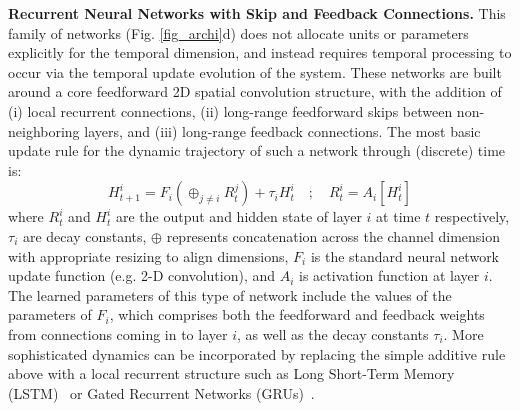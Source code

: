 \textbf{Recurrent Neural Networks with Skip and Feedback Connections.} This family of networks (Fig. \ref{fig_archi}d) does not allocate units or parameters explicitly for the temporal dimension, and instead requires temporal processing to occur via the temporal update evolution of the system.  These networks are built around a core feedforward 2D spatial convolution structure, with the addition of (i) local recurrent connections, (ii) long-range feedforward skips between non-neighboring layers, and (iii) long-range feedback connections.  
The most basic update rule for the dynamic trajectory of such a network through (discrete) time is: 
$$H^i_{t+1} = F_i \left ( \oplus_{j \neq i} R^j_t \right )  + \tau_i H^i_t \quad ;\quad R^i_t = A_i[H^i_t]$$
where $R^i_t$ and $H^i_t$ are the output and hidden state of layer $i$ at time $t$ respectively,  $\tau_i$  are decay constants, $\oplus$ represents concatenation across the channel dimension with appropriate resizing to align dimensions, $F_i$ is the standard neural network update function (e.g. 2-D convolution), and $A_i$ is activation function at layer $i$.  
The learned parameters of this type of network include the values of the parameters of $F_i$, which comprises both the feedforward and feedback weights from connections coming in to layer $i$, as well as the decay constants $\tau_i$. 
More sophisticated dynamics can be incorporated by replacing the simple additive rule above with a local recurrent structure such as Long Short-Term Memory (LSTM)~\cite{Hochreiter1997} or Gated Recurrent Networks (GRUs)~\cite{cho2014properties}.


